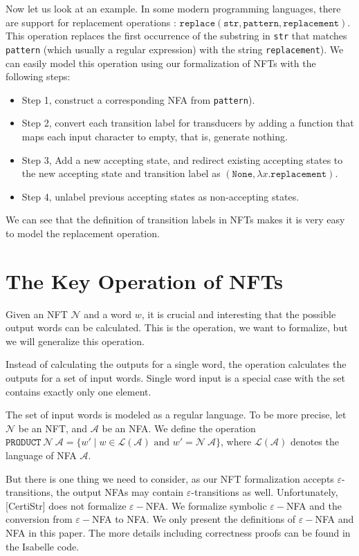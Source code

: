 \documentclass[a4paper,UKenglish,cleveref, autoref, thm-restate]{lipics-v2021}
\begin{document}
Now let us look at an example. In some modern programming languages, there are support for replacement operations : $\texttt{replace}(\texttt{str}, \texttt{pattern}, \texttt{replacement})$. This operation replaces the first occurrence of the substring  in \texttt{str} that matches \texttt{pattern} (which usually a regular expression) with the string \texttt{replacement}). 
We can easily model this operation using our formalization of NFTs with the following steps:
\begin{itemize}
\item Step 1, construct a corresponding NFA from \texttt{pattern}).
\item Step 2, convert each transition label for transducers by adding a function that maps each input character to empty, that is, generate nothing.
\item Step 3, Add a new accepting state, and redirect existing accepting states to the new accepting state and transition label as $(\texttt{None}, \lambda x. \texttt{replacement})$.
\item Step 4, unlabel previous accepting states as non-accepting states. 
\end{itemize}

We can see that the definition of transition labels in NFTs makes it is very easy to model the replacement operation.

\section{The Key Operation of NFTs}

Given an NFT $\mathcal{N}$ and a word $w$, it is crucial and interesting that the possible output words can be calculated. This is the operation, we want to formalize, but we will generalize this operation.

Instead of calculating the outputs for a single word, the operation calculates the outputs for a set of input words. Single word input is a special case with the set contains exactly only one element.

The set of input words is modeled as a regular language. To be more precise, let $\mathcal{N}$ be an NFT, and $\mathcal{A}$ be an NFA. We define the operation $\texttt{PRODUCT} ~\mathcal{N}~\mathcal{A} = \{w'\mid w\in \mathcal{L}(\mathcal{A})\text{ and } w' = \mathcal{N}~\mathcal{A}\}$, where $\mathcal{L}(\mathcal{A})$ denotes the language of NFA $\mathcal{A}$.


But there is one thing we need to consider, as our NFT formalization accepts $\varepsilon$-transitions, the output NFAs may contain $\varepsilon$-transitions as well. Unfortunately, [CertiStr] does not formalize $\varepsilon-$NFA. We formalize symbolic $\varepsilon-$NFA and the conversion from $\varepsilon-$NFA to NFA. We only present the definitions of $\varepsilon-$NFA and NFA in this paper. The more details including correctness proofs can be found in the Isabelle code. 
\end{document}
